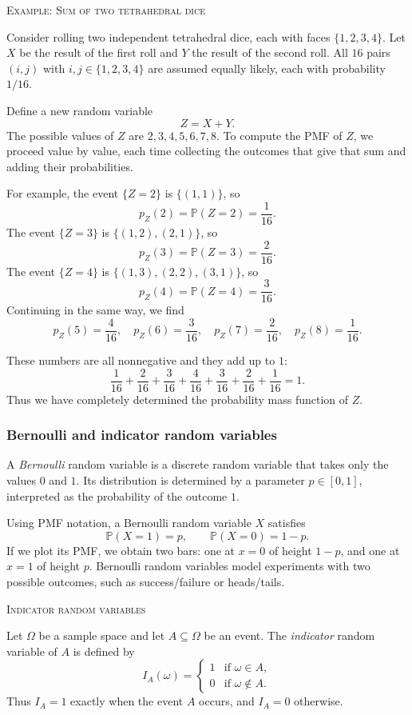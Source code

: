 \bigskip\textsc{Example: Sum of two tetrahedral dice}

Consider rolling two independent tetrahedral dice, each with faces \(\{1,2,3,4\}\).  
Let \(X\) be the result of the first roll and \(Y\) the result of the second roll.  
All \(16\) pairs \((i,j)\) with \(i,j \in \{1,2,3,4\}\) are assumed equally likely, each with probability \(1/16\).  

Define a new random variable
\[
Z = X + Y.
\]
The possible values of \(Z\) are \(2,3,4,5,6,7,8\).  
To compute the PMF of \(Z\), we proceed value by value, each time collecting the outcomes that give that sum and adding their probabilities.

For example, the event \(\{Z = 2\}\) is \(\{(1,1)\}\), so
\[
p_Z(2) = \mathbb{P}(Z = 2) = \frac{1}{16}.
\]
The event \(\{Z = 3\}\) is \(\{(1,2), (2,1)\}\), so
\[
p_Z(3) = \mathbb{P}(Z = 3) = \frac{2}{16}.
\]
The event \(\{Z = 4\}\) is \(\{(1,3), (2,2), (3,1)\}\), so
\[
p_Z(4) = \mathbb{P}(Z = 4) = \frac{3}{16}.
\]
Continuing in the same way, we find
\[
p_Z(5) = \frac{4}{16}, \quad
p_Z(6) = \frac{3}{16}, \quad
p_Z(7) = \frac{2}{16}, \quad
p_Z(8) = \frac{1}{16}.
\]

These numbers are all nonnegative and they add up to \(1\):
\[
\frac{1}{16} + \frac{2}{16} + \frac{3}{16} + \frac{4}{16} + \frac{3}{16} + \frac{2}{16} + \frac{1}{16} = 1.
\]
Thus we have completely determined the probability mass function of \(Z\).



\subsubsection{Bernoulli and indicator random variables}

A \textit{Bernoulli} random variable is a discrete random variable that takes only the values \(0\) and \(1\).  
Its distribution is determined by a parameter \(p \in [0,1]\), interpreted as the probability of the outcome \(1\).  

Using PMF notation, a Bernoulli random variable \(X\) satisfies
\[
\mathbb{P}(X = 1) = p, \qquad \mathbb{P}(X = 0) = 1 - p.
\]
If we plot its PMF, we obtain two bars: one at \(x=0\) of height \(1-p\), and one at \(x=1\) of height \(p\).  
Bernoulli random variables model experiments with two possible outcomes, such as success/failure or heads/tails.

\bigskip\textsc{Indicator random variables}

Let \(\Omega\) be a sample space and let \(A \subseteq \Omega\) be an event.  
The \textit{indicator} random variable of \(A\) is defined by
\[
I_A(\omega) =
\begin{cases}
1 & \text{if } \omega \in A,\\
0 & \text{if } \omega \notin A.
\end{cases}
\]
Thus \(I_A = 1\) exactly when the event \(A\) occurs, and \(I_A = 0\) otherwise.  

